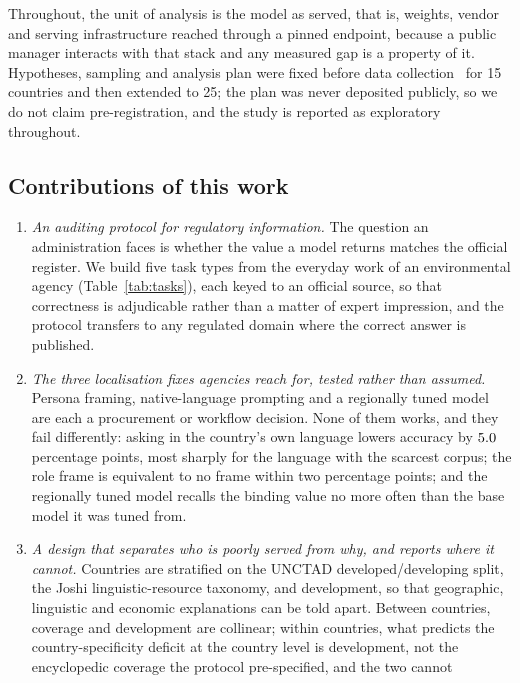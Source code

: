 Throughout, the unit of analysis is the model as served, that is, weights,
vendor and serving infrastructure reached through a pinned endpoint, because a
public manager interacts with that stack and any measured gap is a property of
it. Hypotheses, sampling and analysis plan were fixed before data
collection~\citep{nosek2018preregistration} for 15 countries and then extended
to 25; the plan was never deposited publicly, so we do not claim
pre-registration, and the study is reported as exploratory throughout.

\subsection*{Contributions of this work}

\begin{enumerate}\setlength{\itemsep}{2pt}
\item \emph{An auditing protocol for regulatory information.} The question an
  administration faces is whether the value a model returns matches the
  official register. We build five task types from the everyday work of an
  environmental agency (Table~\ref{tab:tasks}), each keyed to an official
  source, so that correctness is adjudicable rather than a matter of expert
  impression, and the protocol transfers to any regulated domain where the
  correct answer is published.
\item \emph{The three localisation fixes agencies reach for, tested rather than
  assumed.} Persona framing, native-language prompting and a regionally tuned
  model are each a procurement or workflow decision. None of them works, and
  they fail differently: asking in the country's own language lowers accuracy
  by $5.0$ percentage points, most sharply for the language with the
  scarcest corpus; the role frame is equivalent to no frame within two
  percentage points; and the regionally tuned model recalls the binding value no
  more often than the base model it was tuned from.
\item \emph{A design that separates who is poorly served from why, and reports
  where it cannot.} Countries are stratified on the UNCTAD developed/developing
  split, the Joshi linguistic-resource taxonomy, and development, so that
  geographic, linguistic and economic explanations can be told apart. Between
  countries, coverage and development are collinear; within countries, what
  predicts the country-specificity deficit at the country level is development,
  not the encyclopedic coverage the protocol pre-specified, and the two cannot

\end{enumerate}

